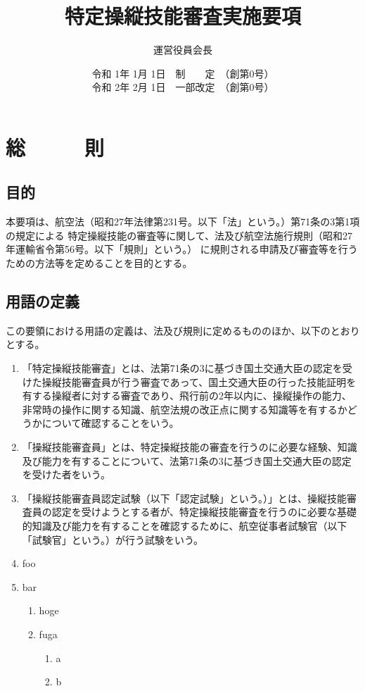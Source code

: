 \documentclass[a4paper,papersize,12pt]{jsarticle}
\author{\color{red}運営役員会長}
\title{\color{red}特定操縦技能審査実施要項}
\date{
    {
        \color{red}
        令和 1年 1月 1日　制　　定　（創第0号）\\
        令和 2年 2月 1日　一部改定　（創第0号）
    }
}
\begin{document}
\maketitle

\section{総　　　則}
\subsection{目的}
本要項は、航空法（昭和27年法律第231号。以下「法」という。）第71条の3第1項の規定による
特定操縦技能の審査等に関して、法及び航空法施行規則（昭和27年運輸省令第56号。以下「規則」という。）
に規則される申請及び審査等を行うための方法等を定めることを目的とする。

\subsection{用語の定義}
この要領における用語の定義は、法及び規則に定めるもののほか、以下のとおりとする。

\begin{enumerate}[label=(\arabic*)]
    \item 「特定操縦技能審査」とは、法第71条の3に基づき国土交通大臣の認定を受けた操縦技能審査員が行う審査であって、国土交通大臣の行った技能証明を有する操縦者に対する審査であり、飛行前の2年以内に、操縦操作の能力、非常時の操作に関する知識、航空法規の改正点に関する知識等を有するかどうかについて確認することをいう。
    \item 「操縦技能審査員」とは、特定操縦技能の審査を行うのに必要な経験、知識及び能力を有することについて、法第71条の3に基づき国土交通大臣の認定を受けた者をいう。
    \item 「操縦技能審査員認定試験（以下「認定試験」という。）」とは、操縦技能審査員の認定を受けようとする者が、特定操縦技能審査を行うのに必要な基礎的知識及び能力を有することを確認するために、航空従事者試験官（以下「試験官」という。）が行う試験をいう。
    \item foo
    \item bar
    \begin{enumerate}[label=\aiu*.]
        \item hoge
        \item fuga
        \begin{enumerate}[label=(\aiu*)]
            \item a
            \item b
        \end{enumerate}
    \end{enumerate}
\end{enumerate}
\end{document}
